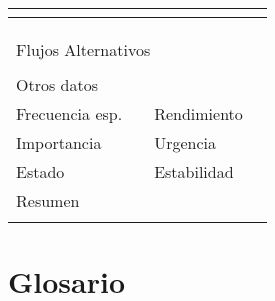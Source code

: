 \documentclass{article}
\begin{document}
\begin{table}[h]
\begin{tabular}{|l|l|l|l|l|l|}
\hline
\multicolumn{1}{|p{1cm}|}{} & \multicolumn{2}{p{3cm}}{} & \multicolumn{1}{|p{1cm}|}{} & \multicolumn{2}{p{3cm}|}{}\\
\hline
\multicolumn{1}{|p{1cm}|}{} & \multicolumn{2}{p{3cm}}{} & \multicolumn{1}{|p{1cm}|}{} & \multicolumn{2}{p{3cm}|}{}\\
\hline
\multicolumn{1}{|p{1cm}|}{} & \multicolumn{2}{p{3cm}}{} & \multicolumn{1}{|p{1cm}|}{} & \multicolumn{2}{p{3cm}|}{}\\
\hline
\multicolumn{1}{|p{1cm}|}{} & \multicolumn{2}{p{3cm}}{} & \multicolumn{1}{|p{1cm}|}{} & \multicolumn{2}{p{3cm}|}{}\\
\hline
\multicolumn{6}{|p{10cm}|}{Flujos Alternativos}\\
\hline
\multicolumn{1}{|p{1cm}}{} & \multicolumn{5}{|p{9cm}|}{}\\
\hline
\multicolumn{6}{|p{10cm}|}{Otros datos}\\
\hline
\multicolumn{1}{|p{2cm}|}{Frecuencia esp.} & \multicolumn{2}{p{3cm}}{} & \multicolumn{1}{|p{2cm}|}{Rendimiento} & \multicolumn{2}{p{3cm}|}{}\\
\hline
\multicolumn{1}{|p{2cm}|}{Importancia} & \multicolumn{2}{p{3cm}}{} & \multicolumn{1}{|p{2cm}|}{Urgencia} & \multicolumn{2}{p{3cm}|}{}\\
\hline
\multicolumn{1}{|p{2cm}|}{Estado} & \multicolumn{2}{p{3cm}}{} & \multicolumn{1}{|p{2cm}|}{Estabilidad} & \multicolumn{2}{p{3cm}|}{}\\
\hline
\multicolumn{6}{|p{10cm}|}{Resumen}\\
\hline
\multicolumn{6}{|p{10cm}|}{}\\
\hline
\end{tabular}
\end{table}
\section{Glosario}
\end{document}

